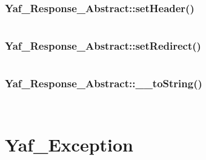 \subsection{Yaf\_Response\_Abstract::setHeader()}


\begin{lstlisting}[language=PHP]

\end{lstlisting}

\subsection{Yaf\_Response\_Abstract::setRedirect()}


\begin{lstlisting}[language=PHP]

\end{lstlisting}

\subsection{Yaf\_Response\_Abstract::\_\_toString()}


\begin{lstlisting}[language=PHP]

\end{lstlisting}


\begin{lstlisting}[language=PHP]

\end{lstlisting}


\chapter{Yaf\_Exception}



\begin{lstlisting}[language=PHP]

\end{lstlisting}


\begin{lstlisting}[language=PHP]

\end{lstlisting}



\begin{lstlisting}[language=PHP]

\end{lstlisting}

\begin{lstlisting}[language=PHP]

\end{lstlisting}


